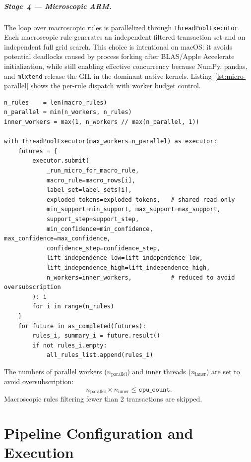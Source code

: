 \paragraph{Stage~4 --- Microscopic ARM.}
The loop over macroscopic rules is parallelized through \texttt{ThreadPoolExecutor}.
Each macroscopic rule generates an independent filtered transaction set and an independent full grid search.
This choice is intentional on macOS: it avoids potential deadlocks caused by process forking after BLAS/Apple Accelerate initialization, while still enabling effective concurrency because NumPy, pandas, and \texttt{mlxtend} release the GIL in the dominant native kernels.
Listing~\ref{lst:micro-parallel} shows the per-rule dispatch with worker budget control.

\begin{lstlisting}[style=pipeline,caption={Parallel per-macro-rule dispatch with oversubscription control (\texttt{src/microscopic\_data\_mining.py}).},label={lst:micro-parallel}]
n_rules    = len(macro_rules)
n_parallel = min(n_workers, n_rules)
inner_workers = max(1, n_workers // max(n_parallel, 1))

with ThreadPoolExecutor(max_workers=n_parallel) as executor:
    futures = {
        executor.submit(
            _run_micro_for_macro_rule,
            macro_rule=macro_rows[i],
            label_set=label_sets[i],
            exploded_tokens=exploded_tokens,   # shared read-only
            min_support=min_support, max_support=max_support,
            support_step=support_step,
            min_confidence=min_confidence, max_confidence=max_confidence,
            confidence_step=confidence_step,
            lift_independence_low=lift_independence_low,
            lift_independence_high=lift_independence_high,
            n_workers=inner_workers,           # reduced to avoid oversubscription
        ): i
        for i in range(n_rules)
    }
    for future in as_completed(futures):
        rules_i, summary_i = future.result()
        if not rules_i.empty:
            all_rules_list.append(rules_i)
\end{lstlisting}

The numbers of parallel workers ($n_{\mathrm{parallel}}$) and inner threads ($n_{\mathrm{inner}}$) are set to avoid oversubscription:
\[
  n_{\mathrm{parallel}} \times n_{\mathrm{inner}} \le \texttt{cpu\_count}.
\]
Macroscopic rules filtering fewer than 2 transactions are skipped.

\chapter{Pipeline Configuration and Execution}
\label{app:pipeline-configuration}

